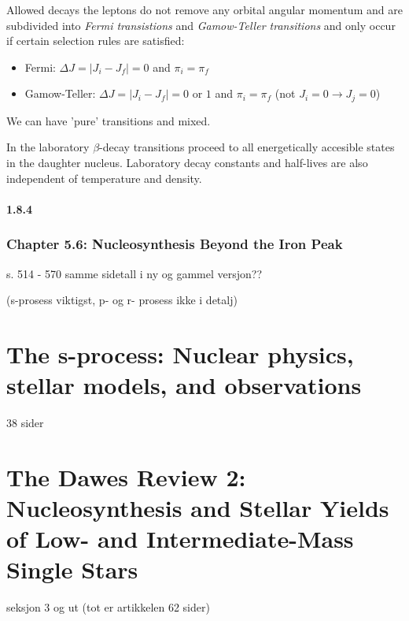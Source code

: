 \documentclass[a4paper,12pt]{article}
\begin{document}
Allowed decays the leptons do not remove any orbital angular momentum and are subdivided into \textit{Fermi transistions} and \textit{Gamow-Teller transitions} and only occur if certain selection rules are satisfied:
\begin{itemize}
\item Fermi: $\Delta J = |J_i - J_f| = 0$ and $\pi_i = \pi_f$
\item Gamow-Teller:  $\Delta J = |J_i - J_f| = 0$ or $1$ and $\pi_i = \pi_f$ (not $J_i = 0 \rightarrow J_j = 0$)
\end{itemize}
We can have 'pure' transitions and mixed.

In the laboratory $\beta$-decay transitions proceed to all energetically accesible states in the daughter nucleus. Laboratory decay constants and half-lives are also independent of temperature and density. 



\subsection*{1.8.4}


\section*{Chapter 5.6: Nucleosynthesis Beyond the Iron Peak}
s. 514 -  570 samme sidetall i ny og gammel versjon??

(s-prosess viktigst, p- og r- prosess ikke i detalj)

\part{The s-process: Nuclear physics, stellar models, and observations}
38 sider



\part{The Dawes Review 2: Nucleosynthesis and Stellar Yields of Low- and Intermediate-Mass Single Stars}
seksjon 3 og ut (tot er artikkelen 62 sider)





\end{document}
